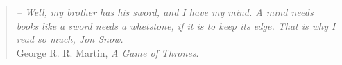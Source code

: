 \documentclass[a4paper,12pt,twoside,index,PageStyleII,print]{0-Misc/PhDThesisPSnPDF}
\begin{document}
\begin{small}
\begin{spacing}{1.00}
{		\let\cleardoublepage\clearpage%
		\listoftables
	}
	\end{spacing}

	\begin{spacing}{0.93}
		
		\cleardoublepage
		

		\vfill{}
		\hr{}


		\begin{small}
			\begin{quote}
				\emph{-- Well, my brother has his sword, and I have my mind. A mind needs \emph{books} like a sword needs a whetstone, if it is to keep its edge. That is why I read so much, Jon Snow.}\\
				George R. R. Martin, \emph{A Game of Thrones}.
			\end{quote}
			\end{small}
	\end{spacing}

	\end{small}   %


	\backmatter
	\cleartoleftpage

	
\end{document}
